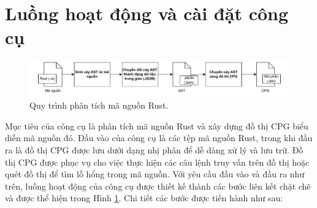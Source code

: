 \section{Luồng hoạt động và cài đặt công cụ}

\begin{figure}[H]
	\includegraphics[width=1\columnwidth]{figures/c3/c3_flow_2.drawio.pdf}
	\centering
	\caption{Quy trình phân tích mã nguồn Rust.}
	\label{img:c3_flow_2}
\end{figure}




Mục tiêu của công cụ là phân tích mã nguồn Rust và xây dựng đồ thị CPG biểu diễn mã nguồn đó.
Đầu vào của công cụ là các tệp mã nguồn Rust, trong khi đầu ra là đồ thị CPG được lưu dưới dạng nhị phân để dễ dàng xử lý và lưu trữ.
Đồ thị CPG được phục vụ cho việc thực hiện các câu lệnh truy vấn trên đồ thị hoặc quét đồ thị để tìm lỗ hổng trong mã nguồn.
Với yêu cầu đầu vào và đầu ra như trên, luồng hoạt động của công cụ được thiết kế thành các bước liên kết chặt chẽ và được thể hiện trong Hình \ref{img:c3_flow_2}.
Chi tiết các bước được tiến hành như sau:

